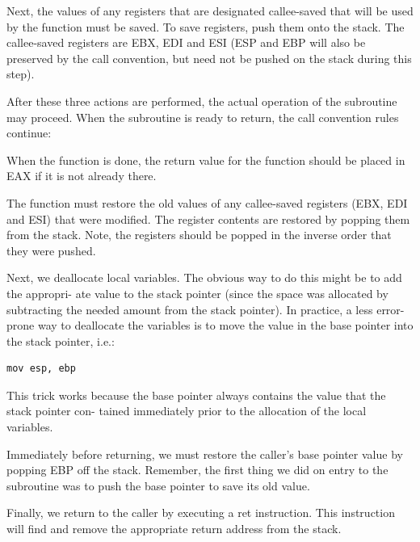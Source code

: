 \begin{numlist}
\item Next, the values of any registers that are designated
  callee-saved that will be used by the function must be saved. To
  save registers, push them onto the stack. The callee-saved registers
  are EBX, EDI and ESI (ESP and EBP will also be preserved by the call
  convention, but need not be pushed on the stack during this step).

  After these three actions are performed, the actual operation of the
  subroutine may proceed.  When the subroutine is ready to return, the
  call convention rules continue:

\item When the function is done, the return value for the function
  should be placed in EAX if it is not already there.

\item The function must restore the old values of any callee-saved
  registers (EBX, EDI and ESI) that were modified. The register contents
  are restored by popping them from the stack. Note, the registers
  should be popped in the inverse order that they were pushed.

\item Next, we deallocate local variables. The obvious way to do this
  might be to add the appropri- ate value to the stack pointer (since
  the space was allocated by subtracting the needed amount from the
  stack pointer). In practice, a less error-prone way to deallocate
  the variables is to move the value in the base pointer into the
  stack pointer, i.e.:

\begin{lstlisting}[backgroundcolor=\color{white},frame=trBL,linewidth=3.75in,xleftmargin=2.25in,label={x86-callee-code-3.lst},language={[x86masm]Assembler},caption={x86 callee code, part 3}]
mov esp, ebp
\end{lstlisting}

This trick works because the base pointer always contains the value
that the stack pointer con- tained immediately prior to the allocation
of the local variables.

\item Immediately before returning, we must restore the caller's base
  pointer value by popping EBP off the stack. Remember, the first
  thing we did on entry to the subroutine was to push the base pointer
  to save its old value.

\item Finally, we return to the caller by executing a ret instruction. This instruction will find and
remove the appropriate return address from the stack.

\end{numlist}


